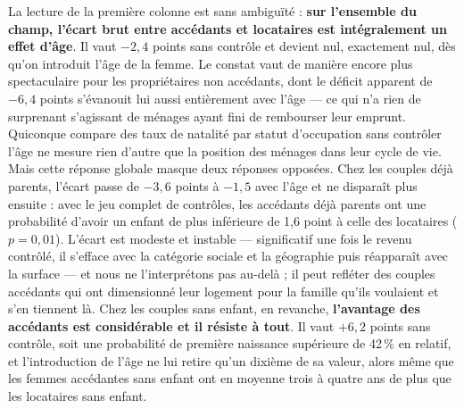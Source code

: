 \documentclass[12pt,a4paper]{article}
\begin{document}
\bigskip

\noindent La lecture de la première colonne est sans ambiguïté : \textbf{sur l'ensemble du champ, l'écart brut entre accédants et locataires est intégralement un effet d'âge}. Il vaut $-2{,}4$ points sans contrôle et devient nul, exactement nul, dès qu'on introduit l'âge de la femme. Le constat vaut de manière encore plus spectaculaire pour les propriétaires non accédants, dont le déficit apparent de $-6{,}4$ points s'évanouit lui aussi entièrement avec l'âge — ce qui n'a rien de surprenant s'agissant de ménages ayant fini de rembourser leur emprunt. Quiconque compare des taux de natalité par statut d'occupation sans contrôler l'âge ne mesure rien d'autre que la position des ménages dans leur cycle de vie. \\

\noindent Mais cette réponse globale masque deux réponses opposées. Chez les couples déjà parents, l'écart passe de $-3{,}6$ points à $-1{,}5$ avec l'âge et ne disparaît plus ensuite : avec le jeu complet de contrôles, les accédants déjà parents ont une probabilité d'avoir un enfant de plus inférieure de 1,6 point à celle des locataires ($p = 0{,}01$). L'écart est modeste et instable — significatif une fois le revenu contrôlé, il s'efface avec la catégorie sociale et la géographie puis réapparaît avec la surface — et nous ne l'interprétons pas au-delà ; il peut refléter des couples accédants qui ont dimensionné leur logement pour la famille qu'ils voulaient et s'en tiennent là. Chez les couples sans enfant, en revanche, \textbf{l'avantage des accédants est considérable et il résiste à tout}. Il vaut $+6{,}2$ points sans contrôle, soit une probabilité de première naissance supérieure de 42\,\% en relatif, et l'introduction de l'âge ne lui retire qu'un dixième de sa valeur, alors même que les femmes accédantes sans enfant ont en moyenne trois à quatre ans de plus que les locataires sans enfant. \\
\end{document}
